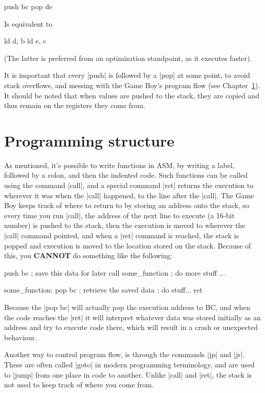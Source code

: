 \documentclass[11pt]{book}
\begin{document}
\begin{code}
push bc
pop de
\end{code}

Is equivalent to 

\begin{code}
ld d, b
ld e, c
\end{code}

(The latter is preferred from an optimization standpoint, as it executes faster).

It is important that every |push| is followed by a |pop| at some point, to avoid stack overflows, and messing with the Game Boy’s program flow (see Chapter~\ref{progstruct}). It should be noted that when values are pushed to the stack, they are copied and thus remain on the registers they come from. 

\section{Programming structure}
\label{progstruct} 
As mentioned, it's possible to write functions in ASM, by writing a label, followed by a colon, and then the indented code. Such functions can be called using the command |call|, and a special command |ret| returns the execution to wherever it was when the |call| happened, to the line after the |call|. The Game Boy keeps track of where to return to by storing an address onto the stack, so every time you run |call|, the address of the next line to execute (a 16-bit number) is pushed to the stack, then the execution is moved to wherever the |call| command pointed, and when a |ret| command is reached, the stack is popped and execution is moved to the location stored on the stack. Because of this, you \textbf{CANNOT} do something like the following:

\begin{code}
push bc ; save this data for later 
call some_function 
; do more stuff 
...

some_function:
  pop bc ; retrieve the saved data 
  ; do stuff...
  ret 
\end{code}

Because the |pop bc| will actually pop the execution address to BC, and when the code reaches the |ret| it will interpret whatever data was stored initially as an address and try to execute code there, which will result in a crash or unexpected behaviour. 

Another way to control program flow, is through the commands |jp| and |jr|. These are often called |goto| in modern programming terminology, and are used to |jump| from one place in code to another. Unlike |call| and |ret|, the stack is not used to keep track of where you come from. 
\end{document}
